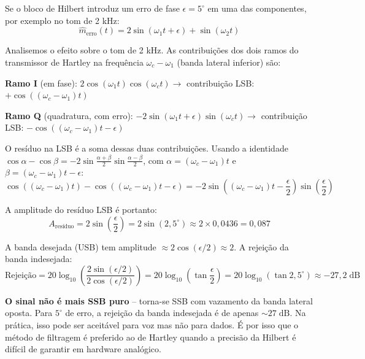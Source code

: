 \documentclass[11pt,a4paper]{article}
\begin{document}
\begin{resolucao}

Se o bloco de Hilbert introduz um erro de fase $\epsilon = 5^\circ$ em uma das componentes, por exemplo no tom de 2 kHz:
\[
  \hat{m}_{\text{erro}}(t) = 2\sin(\omega_1 t + \epsilon) + \sin(\omega_2 t)
\]

Analisemos o efeito sobre o tom de 2 kHz. As contribuições dos dois ramos do transmissor de Hartley na frequência $\omega_c - \omega_1$ (banda lateral inferior) são:

\textbf{Ramo I} (em fase): $2\cos(\omega_1 t)\cos(\omega_c t) \to$ contribuição LSB: $+\cos((\omega_c - \omega_1)t)$

\textbf{Ramo Q} (quadratura, com erro): $-2\sin(\omega_1 t + \epsilon)\sin(\omega_c t) \to$ contribuição LSB: $-\cos((\omega_c - \omega_1)t - \epsilon)$

O resíduo na LSB é a soma dessas duas contribuições. Usando a identidade $\cos\alpha - \cos\beta = -2\sin\!\tfrac{\alpha+\beta}{2}\sin\!\tfrac{\alpha-\beta}{2}$, com $\alpha = (\omega_c{-}\omega_1)t$ e $\beta = (\omega_c{-}\omega_1)t - \epsilon$:
\[
  \cos((\omega_c{-}\omega_1)t) - \cos((\omega_c{-}\omega_1)t - \epsilon) = -2\sin\!\left((\omega_c{-}\omega_1)t - \frac{\epsilon}{2}\right)\sin\!\left(\frac{\epsilon}{2}\right)
\]

A amplitude do resíduo LSB é portanto:
\[
  A_{\text{resíduo}} = 2\sin\!\left(\frac{\epsilon}{2}\right) = 2\sin(2{,}5^\circ) \approx 2 \times 0{,}0436 = 0{,}087
\]

A banda desejada (USB) tem amplitude $\approx 2\cos(\epsilon/2) \approx 2$. A rejeição da banda indesejada:
\[
  \text{Rejeição} = 20\log_{10}\!\left(\frac{2\sin(\epsilon/2)}{2\cos(\epsilon/2)}\right) = 20\log_{10}\!\left(\tan\frac{\epsilon}{2}\right) = 20\log_{10}(\tan 2{,}5^\circ) \approx \boxed{-27{,}2\;\text{dB}}
\]

\textbf{O sinal não é mais SSB puro} -- torna-se SSB com vazamento da banda lateral oposta. Para $5^\circ$ de erro, a rejeição da banda indesejada é de apenas $\sim 27\;\text{dB}$. Na prática, isso pode ser aceitável para voz mas não para dados. É por isso que o método de filtragem é preferido ao de Hartley quando a precisão da Hilbert é difícil de garantir em hardware analógico.
\end{resolucao}


\end{document}
